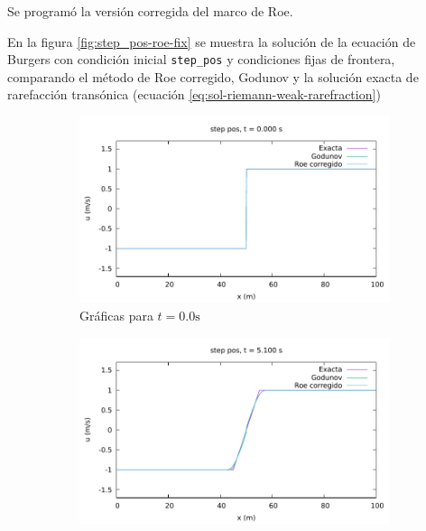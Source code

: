 \documentclass[12pt]{article}
\begin{document}
	Se programó la versión corregida del marco de Roe. 
 	
	
	En la figura \ref{fig:step_pos-roe-fix} se muestra la solución de la ecuación de Burgers con condición inicial \texttt{step\_pos} y condiciones fijas de frontera, comparando el método de Roe corregido, Godunov y la solución exacta de rarefacción transónica (ecuación \ref{eq:sol-riemann-weak-rarefraction})
	
	\begin{figure}[h]
		\centering
		\begin{subfigure}[b]{0.4\textwidth}
			\includegraphics[width=\textwidth]{../burgers1DVF/results/sol_fijas/step_pos-roe-fix/000.pdf}
			\caption*{Gráficas para $t=0.0\unit{\second}$}
		\end{subfigure}
		\hfill
		\begin{subfigure}[b]{0.4\textwidth}
			\includegraphics[width=\textwidth]{../burgers1DVF/results/sol_fijas/step_pos-roe-fix/170.pdf}

\end{subfigure}
\end{figure}
\end{document}
